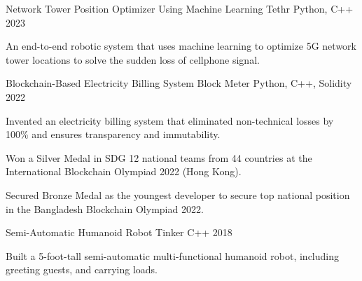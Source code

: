 

\begin{cventries}

  \cventryprojects
    {Network Tower Position Optimizer Using Machine Learning} %
    {Tethr} %
    {Python, C++} %
    {2023} %
    {
      \begin{cvitems} %
        \item {An end-to-end robotic system that uses machine learning to optimize 5G network tower locations 
        to solve the sudden loss of cellphone signal.}
      \end{cvitems}
    }

  \cventryprojects
    {Blockchain-Based Electricity Billing System } %
    {Block Meter} %
    {Python, C++, Solidity} %
    {2022} %
    {
      \begin{cvitems} %
        \item {Invented an electricity billing system that eliminated non-technical losses by 100\% and ensures transparency and immutability.}
        \item {Won a Silver Medal in SDG 12 national teams from 44 countries at the International Blockchain Olympiad 2022 (Hong Kong).}
        \item {Secured Bronze Medal as the youngest developer to secure top national position in the Bangladesh Blockchain Olympiad 2022.}
      \end{cvitems}
    }

  \cventryprojects
    {Semi-Automatic Humanoid Robot} %
    {Tinker} %
    {C++} %
    {2018} %
    {
      \begin{cvitems} %
        \item { Built a 5-foot-tall semi-automatic multi-functional humanoid robot, including greeting guests, and carrying loads.}
      \end{cvitems}
    }


\end{cventries}
